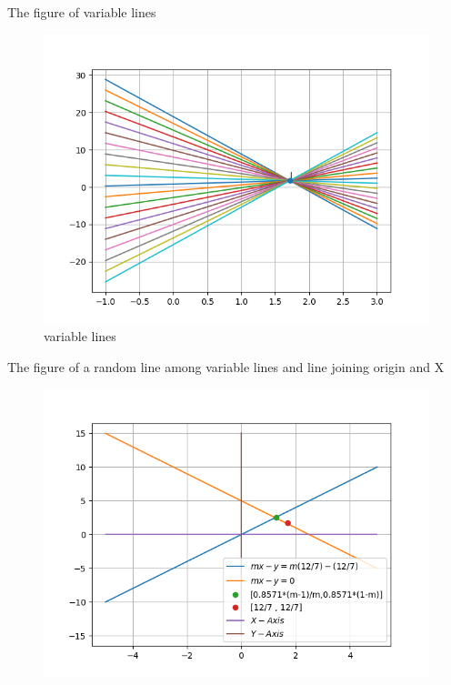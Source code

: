 \documentclass{beamer}
\begin{document}
\begin{frame}
The figure of variable lines
\begin{figure}
\includegraphics[scale=0.5]{fam}
\caption{variable lines}
\end{figure}

\end{frame}
\begin{frame}
The figure of a random line among variable lines and line joining origin and X
\begin{figure}
\includegraphics[scale=0.5]{final}
\end{figure}
\end{frame}
\end{document}
